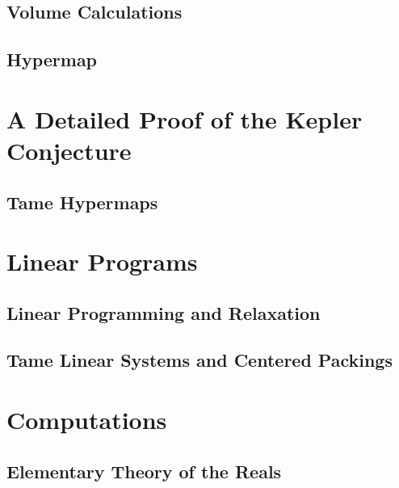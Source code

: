 \documentclass[onecolumn]{newsiambook}
\begin{document}
    \chapter{Volume Calculations}
    
    \chapter{Hypermap}\label{chap:hypermap}
    



    \part{A Detailed Proof of the Kepler Conjecture}
    
    
    
    \chapter{Tame Hypermaps}
    


    \part{Linear Programs}
    \label{part:lp}
    \label{part:lprelax}
    \chapter{Linear Programming and Relaxation}
    
    \chapter{Tame Linear Systems and Centered Packings}
    



    \part{Computations}
    \label{part:appendix}
    
    \chapter{Elementary Theory of the Reals}
     
\end{document}
